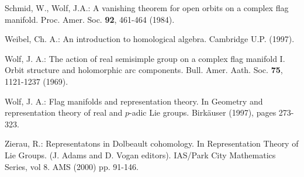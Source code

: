 \documentclass[xypic,amscd,syntonly,amssymb,verbatim,12pt]{amsart}
\theoremstyle{plain}
\theoremstyle{definition}
\theoremstyle{remark}
\numberwithin{equation}{section}
\begin{document}
\begin{thebibliography}{99}
 





 


 

 Schmid, W., Wolf, J.A.: A vanishing theorem for open orbits on a
 complex flag manifold. Proc. Amer. Soc. {\bf 92}, 461-464 (1984).


 
  
  




 
  
  
 

 


  
  
  
  

Weibel, Ch. A.: An introduction to homological algebra. Cambridge
U.P. (1997).


Wolf, J. A.: The action of real semisimple group on a complex flag
manifold I. Orbit structure and holomorphic arc components. Bull.
Amer. Aath. Soc. {\bf 75}, 1121-1237 (1969).


Wolf, J. A.: Flag manifolds and representation theory. In Geometry
and representation theory of real and $p$-adic Lie groups.
Birk\"auser  (1997),  pages 273-323.


Zierau, R.: Representatons in Dolbeault cohomology.
  In  Representation Theory of Lie Groups. (J.
  Adams and D. Vogan editors). IAS/Park City Mathematics Series,
  vol 8.  AMS (2000) pp. 91-146.



\end{thebibliography}
\end{document}
